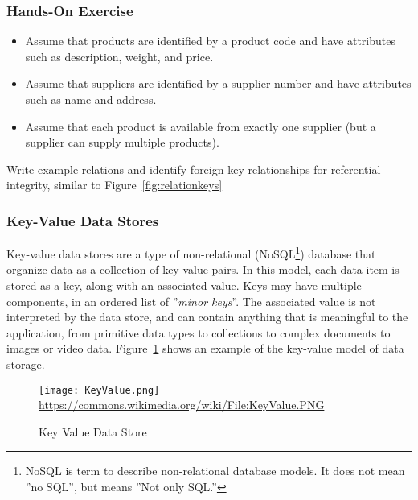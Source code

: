\begin{tcolorbox}[colback=code]
\subsubsection*{Hands-On Exercise} 

\begin{itemize}
	\item Assume that products are identified by a product code and have attributes such as description, weight, and price. 
	\item Assume that suppliers are identified by a supplier number and have attributes such as name and address.
	\item Assume that each product is available from exactly one supplier (but a supplier can supply multiple products).
\end{itemize}

\vspace{.5\baselineskip}
Write example relations and identify foreign-key relationships for referential integrity, similar to Figure~\ref{fig:relationkeys}
\end{tcolorbox}


\subsubsection*{Key-Value Data Stores}

Key-value data stores are a type of non-relational (NoSQL\footnote{NoSQL is term to describe non-relational database models. It does not mean ''no SQL'', but means ''Not only SQL.''}) database that organize data as a collection of key-value pairs. In this model, each data item is stored as a key, along with an associated value. Keys may have multiple components, in an ordered list of ''\emph{minor keys}''. The associated value is not interpreted by the data store, and can contain anything that is meaningful to the application, from primitive data types to collections to complex documents to images or video data. Figure~\ref{fig:keyvalue} shows an example of the key-value model of data storage.

\begin{figure}[h]
\centering
\texttt{[image: KeyValue.png]}
\scriptsize{\url{https://commons.wikimedia.org/wiki/File:KeyValue.PNG}}
\caption{Key Value Data Store}
\label{fig:keyvalue}
\end{figure}

